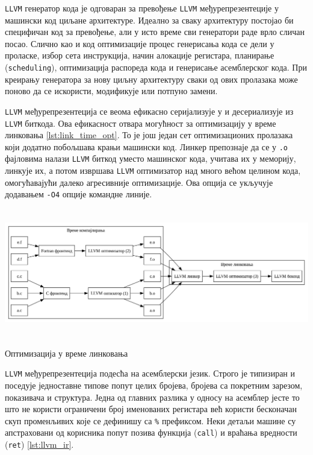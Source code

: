 \verb|LLVM| генератор кода је одговаран за превођење \verb|LLVM| међурепрезентеције у машински код циљане 
архитектуре. Идеално за сваку архитектуру постојао би специфичан код за превођење, али у исто време 
сви генератори раде врло сличан посао. Слично као и код оптимизације процес генерисања кода се дели у проласке,
избор сета инструкција, начин алокације регистара, планирање (\verb|scheduling|), оптимизација распореда 
кода и генерисање асемблерског кода. При креирању генератора за нову циљну архитектуру сваки од ових пролазака
може поново да се искористи, модификује или потпуно замени.

\verb|LLVM| међурепрезентеција се веома ефикасно серијализује у и десериализује из \verb|LLVM| биткода. 
Ова ефикасност отвара могућност за оптимизацију у време линковања \ref{lst:link_time_opt}. То је још један сет оптимизационих пролазака 
који додатно побољшава крањи машински код. Линкер препознаје да се у \verb|.o| фајловима налази 
\verb|LLVM| биткод уместо машинског кода, учитава их у меморију, линкује их, а потом извршава \verb|LLVM|
оптимизатор над много већом целином кода, омогућавајући далеко агресивније оптимизације. 
Ова опција се укључује додавањем \verb|-O4| опције командне линије. 

\begin{listing}[H]
\begin{center}
\includegraphics[width=6in, height=2.2in]{assets/images/link_time_optimization.png}
\end{center}
\caption{Оптимизација у време линковања}
\label{lst:link_time_opt}
\end{listing}

\verb|LLVM| међурепрезентеција подесћа на асемблерски језик. Строго је типизиран и поседује једноставне 
типове попут целих бројева, бројева са покретним зарезом, показивача и структура. Једна од главних разлика 
у односу на асемблер јесте то што не користи ограничени број именованих регистара већ користи бесконачан 
скуп променљивих које се дефинишу са \verb|%| префиксом. Неки детаљи машине су апстраховани од корисника 
попут позива функција (\verb|call|) и враћања вредности (\verb|ret|) \ref{lst:llvm_ir}.

